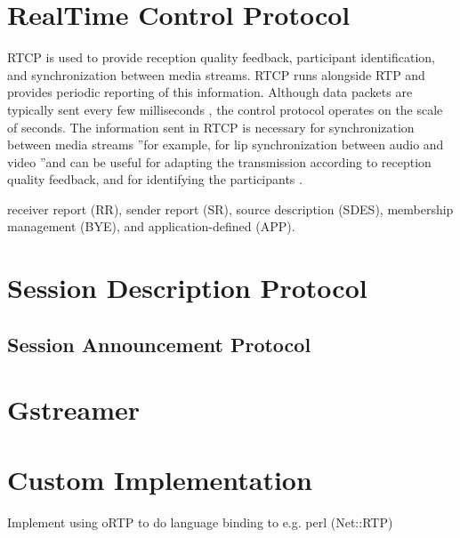 \cite{perkins2003rtp}
\section{RealTime Control Protocol}
RTCP is used to provide reception quality feedback, participant identification, and synchronization between media streams. RTCP runs alongside RTP and provides periodic reporting of this information. Although data packets are typically sent every few milliseconds , the control protocol operates on the scale of seconds. The information sent in RTCP is necessary for synchronization between media streams ”for example, for lip synchronization between audio and video ”and can be useful for adapting the transmission according to reception quality feedback, and for identifying the participants . 

receiver report (RR), sender report (SR), source description (SDES), membership management (BYE), and application-defined (APP). 

\section{Session Description Protocol}

\subsection{Session Announcement Protocol}


\section{Gstreamer}


\section{Custom Implementation}
Implement using oRTP to do language binding to e.g. perl (Net::RTP)